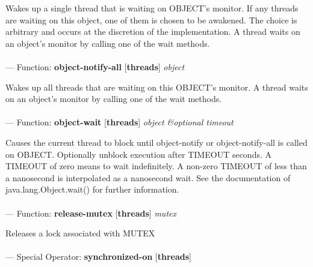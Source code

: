 \begin{adjustwidth}{5em}{5em}
Wakes up a single thread that is waiting on OBJECT's monitor.
If any threads are waiting on this object, one of them is chosen to be awakened. The choice is arbitrary and occurs at the discretion of the implementation. A thread waits on an object's monitor by calling one of the wait methods.
\end{adjustwidth}

\paragraph{}
\label{THREADS:OBJECT-NOTIFY-ALL}
--- Function: \textbf{object-notify-all} [\textbf{threads}] \textit{object}

\begin{adjustwidth}{5em}{5em}
Wakes up all threads that are waiting on this OBJECT's monitor.
A thread waits on an object's monitor by calling one of the wait methods.
\end{adjustwidth}

\paragraph{}
\label{THREADS:OBJECT-WAIT}
--- Function: \textbf{object-wait} [\textbf{threads}] \textit{object \&optional timeout}

\begin{adjustwidth}{5em}{5em}
Causes the current thread to block until object-notify or object-notify-all is called on OBJECT.
Optionally unblock execution after TIMEOUT seconds.  A TIMEOUT of zero
means to wait indefinitely.
A non-zero TIMEOUT of less than a nanosecond is interpolated as a nanosecond wait.
See the documentation of java.lang.Object.wait() for further
information.

\end{adjustwidth}

\paragraph{}
\label{THREADS:RELEASE-MUTEX}
--- Function: \textbf{release-mutex} [\textbf{threads}] \textit{mutex}

\begin{adjustwidth}{5em}{5em}
Releases a lock associated with MUTEX
\end{adjustwidth}

\paragraph{}
\label{THREADS:SYNCHRONIZED-ON}
--- Special Operator: \textbf{synchronized-on} [\textbf{threads}] \textit{}

